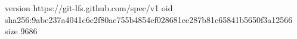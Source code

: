 version https://git-lfs.github.com/spec/v1
oid sha256:9abe237a4041c6e2f80ae755b4854ef028681ee287b81c65841b5650f3a12566
size 9686
